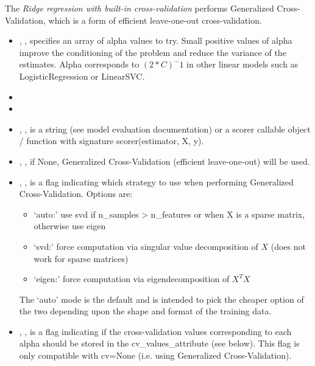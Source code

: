 The \textit{Ridge regression with built-in cross-validation} performs
Generalized Cross-Validation, which is a form of efficient leave-one-out
cross-validation.
%
\begin{itemize}
  \item {}, , specifies
  an array of alpha values to try.
  Small positive values of alpha improve the conditioning of the problem and
  reduce the variance of the estimates.
  Alpha corresponds to $(2*C)^-1$ in other linear models such as
  LogisticRegression or LinearSVC.
  \item {}
  \item {}
  \item {}, , is a
  string (see model evaluation documentation) or a scorer callable object /
  function with signature scorer(estimator, X, y).
  \item {}, , if
  None, Generalized Cross-Validation (efficient leave-one-out) will be used.
  \item {}, , is a flag indicating which strategy to use when performing Generalized
  Cross-Validation.
  Options are:
	\begin{itemize}
    \item `auto:' use svd if n\_samples > n\_features or when X is a
    sparse matrix, otherwise use eigen
  	\item `svd:' force computation via singular value decomposition of $X$
    (does not work for sparse matrices)
	  \item `eigen:' force computation via eigendecomposition of $X^T X$
	\end{itemize}
	The `auto' mode is the default and is intended to pick the cheaper
  option of the two depending upon the shape and format of the training data.
  \item {}, , is a flag indicating if
  the cross-validation values corresponding to each alpha should be stored in
  the cv\_values\_attribute (see below).
  This flag is only compatible with cv=None (i.e. using Generalized
  Cross-Validation).
\end{itemize}

